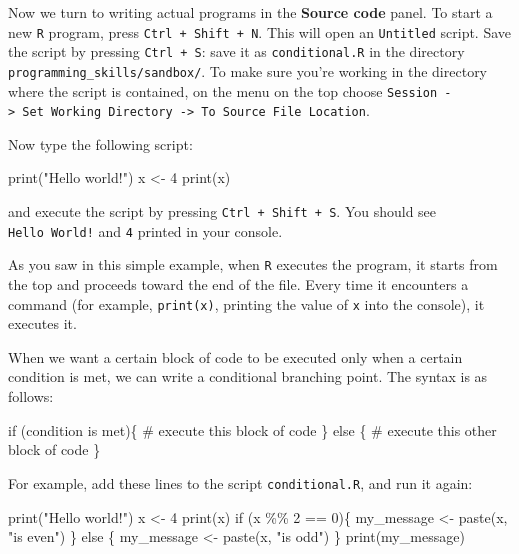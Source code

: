 \documentclass[
  letterpaper,
  DIV=11,
  numbers=noendperiod]{scrreprt}
\newenvironment{Shaded}{\begin{snugshade}}{\end{snugshade}}
\newcommand{\CommentTok}[1]{\textcolor[rgb]{0.37,0.37,0.37}{#1}}
\newcommand{\ControlFlowTok}[1]{\textcolor[rgb]{0.00,0.23,0.31}{#1}}
\newcommand{\DecValTok}[1]{\textcolor[rgb]{0.68,0.00,0.00}{#1}}
\newcommand{\FunctionTok}[1]{\textcolor[rgb]{0.28,0.35,0.67}{#1}}
\newcommand{\NormalTok}[1]{\textcolor[rgb]{0.00,0.23,0.31}{#1}}
\newcommand{\OtherTok}[1]{\textcolor[rgb]{0.00,0.23,0.31}{#1}}
\newcommand{\SpecialCharTok}[1]{\textcolor[rgb]{0.37,0.37,0.37}{#1}}
\newcommand{\StringTok}[1]{\textcolor[rgb]{0.13,0.47,0.30}{#1}}
\begin{document}
Now we turn to writing actual programs in the \textbf{Source code}
panel. To start a new \texttt{R} program, press
\texttt{Ctrl\ +\ Shift\ +\ N}. This will open an \texttt{Untitled}
script. Save the script by pressing \texttt{Ctrl\ +\ S}: save it as
\texttt{conditional.R} in the directory
\texttt{programming\_skills/sandbox/}. To make sure you're working in
the directory where the script is contained, on the menu on the top
choose
\texttt{Session\ -\textgreater{}\ Set\ Working\ Directory\ -\textgreater{}\ To\ Source\ File\ Location}.

Now type the following script:

\begin{Shaded}
\begin{Highlighting}[]
\FunctionTok{print}\NormalTok{(}\StringTok{"Hello world!"}\NormalTok{)}
\NormalTok{x }\OtherTok{\textless{}{-}} \DecValTok{4}
\FunctionTok{print}\NormalTok{(x)}
\end{Highlighting}
\end{Shaded}

and execute the script by pressing \texttt{Ctrl\ +\ Shift\ +\ S}. You
should see \texttt{Hello\ World!} and \texttt{4} printed in your
console.

As you saw in this simple example, when \texttt{R} executes the program,
it starts from the top and proceeds toward the end of the file. Every
time it encounters a command (for example, \texttt{print(x)}, printing
the value of \texttt{x} into the console), it executes it.

When we want a certain block of code to be executed only when a certain
condition is met, we can write a conditional branching point. The syntax
is as follows:

\begin{Shaded}
\begin{Highlighting}[]
\ControlFlowTok{if}\NormalTok{ (condition is met)\{}
  \CommentTok{\# execute this block of code}
\NormalTok{\} }\ControlFlowTok{else}\NormalTok{ \{}
  \CommentTok{\# execute this other block of code}
\NormalTok{\}}
\end{Highlighting}
\end{Shaded}

For example, add these lines to the script \texttt{conditional.R}, and
run it again:

\begin{Shaded}
\begin{Highlighting}[]
\FunctionTok{print}\NormalTok{(}\StringTok{"Hello world!"}\NormalTok{)}
\NormalTok{x }\OtherTok{\textless{}{-}} \DecValTok{4}
\FunctionTok{print}\NormalTok{(x)}
\ControlFlowTok{if}\NormalTok{ (x }\SpecialCharTok{\%\%} \DecValTok{2} \SpecialCharTok{==} \DecValTok{0}\NormalTok{)\{}
\NormalTok{  my\_message }\OtherTok{\textless{}{-}} \FunctionTok{paste}\NormalTok{(x, }\StringTok{"is even"}\NormalTok{)}
\NormalTok{\} }\ControlFlowTok{else}\NormalTok{ \{}
\NormalTok{  my\_message }\OtherTok{\textless{}{-}} \FunctionTok{paste}\NormalTok{(x, }\StringTok{"is odd"}\NormalTok{)}
\NormalTok{\}}
\FunctionTok{print}\NormalTok{(my\_message)}
\end{Highlighting}
\end{Shaded}
\end{document}
